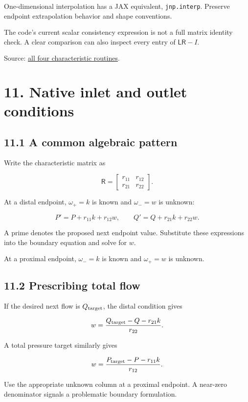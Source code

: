 \documentclass[11pt,a4paper]{article}
\begin{document}
One-dimensional interpolation has a JAX equivalent, \texttt{jnp.\allowbreak{}interp}. Preserve endpoint extrapolation behavior and shape conventions.

The code's current scalar consistency expression is not a full matrix identity check. A clear comparison can also inspect every entry of \(\mathsf L\mathsf R-I\).

Source: \href{/home/sadid/starfish/SolverLib/classSystemEquations.py}{all four characteristic routines}.

\clearpage
\section{11. Native inlet and outlet conditions}
\subsection{11.1 A common algebraic pattern}
Write the characteristic matrix as


\begingroup\small
\[
\mathsf R=
\begin{bmatrix}r_{11}&r_{12}\\r_{21}&r_{22}\end{bmatrix}.
\]
\endgroup


At a distal endpoint, \(\omega_+=k\) is known and \(\omega_-=w\) is unknown:


\begingroup\small
\[
P'=P+r_{11}k+r_{12}w,
\qquad
Q'=Q+r_{21}k+r_{22}w.
\]
\endgroup


A prime denotes the proposed next endpoint value. Substitute these expressions into the boundary equation and solve for \(w\).

At a proximal endpoint, \(\omega_-=k\) is known and \(\omega_+=w\) is unknown.

\subsection{11.2 Prescribing total flow}
If the desired next flow is \(Q_{\rm target}\), the distal condition gives


\begingroup\small
\[
w=\frac{Q_{\rm target}-Q-r_{21}k}{r_{22}}.
\]
\endgroup


A total pressure target similarly gives


\begingroup\small
\[
w=\frac{P_{\rm target}-P-r_{11}k}{r_{12}}.
\]
\endgroup


Use the appropriate unknown column at a proximal endpoint. A near-zero denominator signals a problematic boundary formulation.
\end{document}
